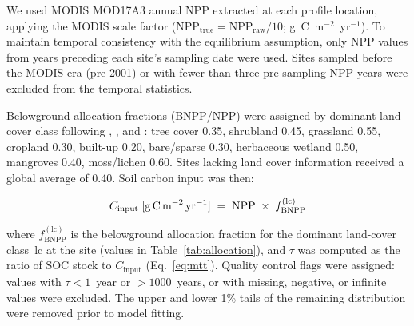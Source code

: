 \documentclass[12pt, a4paper]{article}
\begin{document}
We used MODIS MOD17A3 annual NPP
\citep[2001--2020;][]{Running2021} extracted at each profile location,
applying the MODIS scale factor
($\text{NPP}_\text{true} = \text{NPP}_\text{raw} / 10$;
g~C~m$^{-2}$~yr$^{-1}$). To maintain temporal consistency with the
equilibrium assumption, only NPP values from years preceding each
site's sampling date were used. Sites sampled before the MODIS era
(pre-2001) or with fewer than three pre-sampling NPP years were
excluded from the temporal statistics.

Belowground allocation fractions (BNPP/NPP) were assigned by dominant
land cover class following \citet{Mokany2006}, \citet{Malhi2011}, and
\citet{Litton2008}: tree cover 0.35, shrubland 0.45, grassland 0.55,
cropland 0.30, built-up 0.20, bare/sparse 0.30, herbaceous wetland 0.50, mangroves 0.40, moss/lichen
0.60. Sites lacking land cover information received a global average of
0.40. Soil carbon input was then:

\begin{equation}
  C_\text{input}\;[\text{g\,C\,m}^{-2}\text{\,yr}^{-1}]
  \;=\; \text{NPP} \;\times\; f_\text{BNPP}^{(\text{lc})}
  \label{eq:c_input}
\end{equation}

\noindent
where $f_\text{BNPP}^{(\text{lc})}$ is the belowground allocation fraction
for the dominant land-cover class~lc at the site (values in
Table~\ref{tab:allocation}), and $\tau$ was computed as the ratio of SOC stock to $C_\text{input}$
(Eq.~\ref{eq:mtt}). Quality control flags were assigned: values with
$\tau < 1$~year or $> 1000$~years, or with missing, negative, or
infinite values were excluded. The upper and lower 1\% tails of the
remaining distribution were removed prior to model fitting.
\end{document}

